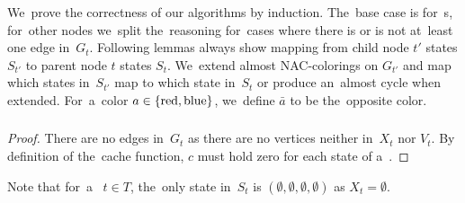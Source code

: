 We~prove the correctness of our algorithms by induction.
The~base case is for~\LeafNode{}s, for~other nodes we~split the~reasoning for~cases where
there is or is not at~least one edge in~\( G_t \).
%
Following lemmas always show mapping from child node \( t' \) states \( S_{t'} \)
to parent node \( t \) states \( S_t \).
We~extend almost NAC-colorings on \( G_{t'} \) and
map which states in~\( S_{t'} \) map to which state in~\( S_t \)
or produce an~almost cycle when extended.
%
For~a~color \( a \in \{\text{red}, \text{blue}\} \),
we~define \( \bar{a} \) to be the~opposite color.

\subsubsection*{\LeafNode{}}

%
\begin{proof}
	There are no edges in~\( G_t \) as there are no vertices
	neither in~\( X_t \) nor \( V_t \).
	By definition of the~cache function,
	\( c \) must hold zero for each state of a~\LeafNode{}.
\end{proof}
%
Note that for~a~\LeafNode{} \( t \in T \),
the~only state in~\( S_t \) is \( (\emptyset, \emptyset, \emptyset, \emptyset) \)
as \( X_t = \emptyset \).

\clearpage
\subsubsection*{\IntroduceVertexNode{}}

